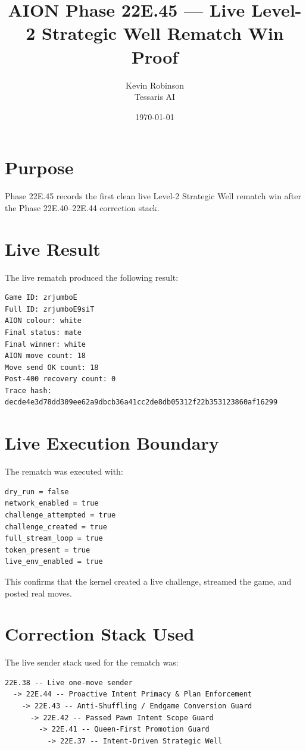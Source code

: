 \documentclass[11pt,a4paper]{article}
\title{\textbf{AION Phase 22E.45 --- Live Level-2 Strategic Well Rematch Win Proof}}
\author{Kevin Robinson\\Tessaris AI}
\date{\today}
\begin{document}
\maketitle

\section{Purpose}

Phase 22E.45 records the first clean live Level-2 Strategic Well rematch win after the Phase 22E.40--22E.44 correction stack.

\section{Live Result}

The live rematch produced the following result:

\begin{verbatim}
Game ID: zrjumboE
Full ID: zrjumboE9siT
AION colour: white
Final status: mate
Final winner: white
AION move count: 18
Move send OK count: 18
Post-400 recovery count: 0
Trace hash: decde4e3d78dd309ee62a9dbcb36a41cc2de8db05312f22b353123860af16299
\end{verbatim}

\section{Live Execution Boundary}

The rematch was executed with:

\begin{verbatim}
dry_run = false
network_enabled = true
challenge_attempted = true
challenge_created = true
full_stream_loop = true
token_present = true
live_env_enabled = true
\end{verbatim}

This confirms that the kernel created a live challenge, streamed the game, and posted real moves.

\section{Correction Stack Used}

The live sender stack used for the rematch was:

\begin{verbatim}
22E.38 -- Live one-move sender
  -> 22E.44 -- Proactive Intent Primacy & Plan Enforcement
    -> 22E.43 -- Anti-Shuffling / Endgame Conversion Guard
      -> 22E.42 -- Passed Pawn Intent Scope Guard
        -> 22E.41 -- Queen-First Promotion Guard
          -> 22E.37 -- Intent-Driven Strategic Well
\end{verbatim}
\end{document}

